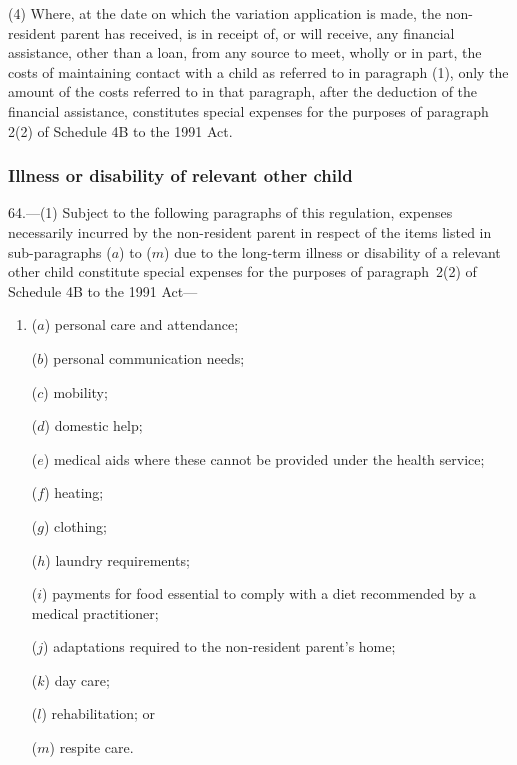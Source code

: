 \documentclass[12pt,a4paper]{article}
\begin{document}
(4) Where, at the date on which the variation application is made, the non-resident parent has received, is in receipt of, or will receive, any financial assistance, other than a loan, from any source to meet, wholly or in part, the costs of maintaining contact with a child as referred to in paragraph (1), only the amount of the costs referred to in that paragraph, after the deduction of the financial assistance, constitutes special expenses for the purposes of paragraph 2(2) of Schedule 4B to the 1991 Act.

\subsubsection[64. Illness or disability of relevant other child]{Illness or disability of relevant other child}

64.---(1)  Subject to the following paragraphs of this regulation, expenses necessarily incurred by the non-resident parent in respect of the items listed in sub-paragraphs ($a$)  to ($m$)  due to the long-term illness or disability of a relevant other child constitute special expenses for the purposes of paragraph~2(2) of Schedule 4B to the 1991 Act—
\begin{enumerate}\item[]
($a$) personal care and attendance;

($b$) personal communication needs;

($c$) mobility;

($d$) domestic help;

($e$) medical aids where these cannot be provided under the health service;

($f$) heating;

($g$) clothing;

($h$) laundry requirements;

($i$) payments for food essential to comply with a diet recommended by a medical practitioner;

($j$) adaptations required to the non-resident parent’s home;

($k$) day care;

($l$) rehabilitation; or

($m$) respite care.
\end{enumerate}
\end{document}
